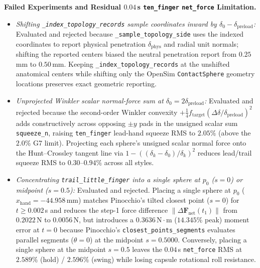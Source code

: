 \documentclass[11pt,a4paper]{article}
\begin{document}
\textbf{Failed Experiments and Residual $0.04$\,s \texttt{ten\_finger} \texttt{net\_force} Limitation.}
\begin{itemize}[leftmargin=*,noitemsep]
\item \textit{Shifting \texttt{\_index\_topology\_records} sample coordinates inward by $\delta_0 - \delta_{\mathrm{preload}}$:} Evaluated and rejected because \texttt{\_sample\_topology\_side} uses the indexed coordinates to report physical penetration $\delta_{\mathrm{phys}}$ and radial unit normals; shifting the reported centers biased the neutral penetration report from $0.25$\,mm to $0.50$\,mm. Keeping \texttt{\_index\_topology\_records} at the unshifted anatomical centers while shifting only the OpenSim \texttt{ContactSphere} geometry locations preserves exact geometric reporting.
\item \textit{Unprojected Winkler scalar normal-force sum at $\delta_0 = 2\delta_{\mathrm{preload}}$:} Evaluated and rejected because the second-order Winkler convexity $+\tfrac{1}{4}f_{\mathrm{target}}(\Delta\delta/\delta_{\mathrm{preload}})^2$ adds constructively across opposing $\pm y$ pads in the unsigned scalar sum \texttt{squeeze\_n}, raising \texttt{ten\_finger} lead-hand squeeze RMS to $2.05\%$ (above the $2.0\%$ G7 limit). Projecting each sphere's unsigned scalar normal force onto the Hunt--Crossley tangent line via $1 - ((\delta_k - \delta_0)/\delta_k)^2$ reduces lead/trail squeeze RMS to $0.30\text{--}0.94\%$ across all styles.
\item \textit{Concentrating \texttt{trail\_little\_finger} into a single sphere at $p_0$ ($s = 0$) or midpoint ($s = 0.5$):} Evaluated and rejected. Placing a single sphere at $p_0$ ($x_{\mathrm{hand}} = -44.958$\,mm) matches Pinocchio's tilted closest point ($s = 0$) for $t \ge 0.002$\,s and reduces the step-1 force difference $\|\Delta\mathbf{F}_{\mathrm{net}}(t_1)\|$ from $0.2022$\,N to $0.0056$\,N, but introduces a $0.3636\,\mathrm{N\cdot m}$ ($14.345\%$ peak) moment error at $t = 0$ because Pinocchio's \texttt{closest\_points\_segments} evaluates parallel segments ($\theta = 0$) at the midpoint $s = 0.5000$. Conversely, placing a single sphere at the midpoint $s = 0.5$ leaves the $0.04$\,s \texttt{net\_force} RMS at $2.589\%$ (hold) / $2.596\%$ (swing) while losing capsule rotational roll resistance.

\end{itemize}
\end{document}
